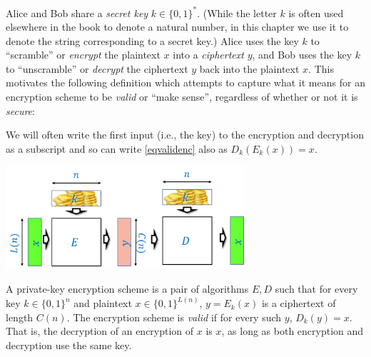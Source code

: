 Alice and Bob share a \emph{secret key} \(k \in \{0,1\}^*\). (While the
letter \(k\) is often used elsewhere in the book to denote a natural
number, in this chapter we use it to denote the string corresponding to
a secret key.) Alice uses the key \(k\) to ``scramble'' or
\emph{encrypt} the plaintext \(x\) into a \emph{ciphertext} \(y\), and
Bob uses the key \(k\) to ``unscramble'' or \emph{decrypt} the
ciphertext \(y\) back into the plaintext \(x\). This motivates the
following definition which attempts to capture what it means for an
encryption scheme to be \emph{valid} or ``make sense'', regardless of
whether or not it is \emph{secure}:

\hypertarget{encryptiondef}{}

We will often write the first input (i.e., the key) to the encryption
and decryption as a subscript and so can write \eqref{eqvalidenc} also
as \(D_k(E_k(x))=x\).


\begin{marginfigure}
\centering
\includegraphics[width=\linewidth, height=1.5in, keepaspectratio]{../figure/encryptionvalid.png}
\caption{A private-key encryption scheme is a pair of algorithms \(E,D\)
such that for every key \(k\in \{0,1\}^n\) and plaintext
\(x\in \{0,1\}^{L(n)}\), \(y=E_k(x)\) is a ciphertext of length
\(C(n)\). The encryption scheme is \emph{valid} if for every such \(y\),
\(D_k(y)=x\). That is, the decryption of an encryption of \(x\) is
\(x\), as long as both encryption and decryption use the same key.}
\label{validencryption}
\end{marginfigure}

